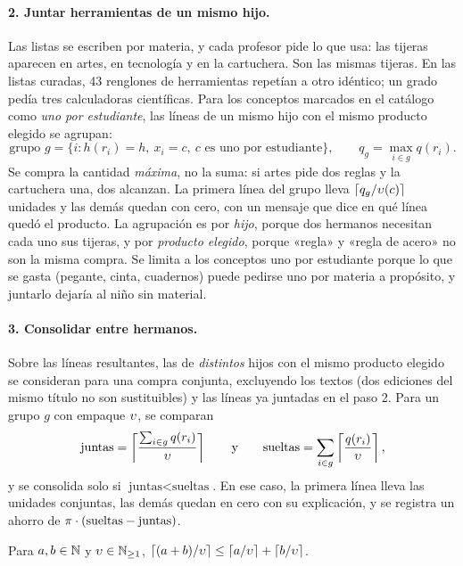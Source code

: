 \paragraph{2. Juntar herramientas de un mismo hijo.} Las listas se escriben por
materia, y cada profesor pide lo que usa: las tijeras aparecen en artes, en
tecnología y en la cartuchera. Son las mismas tijeras. En las listas curadas,
43 renglones de herramientas repetían a otro idéntico; un grado pedía tres
calculadoras científicas. Para los conceptos marcados en el catálogo como
\emph{uno por estudiante}, las líneas de un mismo hijo con el mismo producto
elegido se agrupan:
\[
  \text{grupo } g=\{i : h(r_i)=h,\ x_i=c,\ c \text{ es uno por estudiante}\},
  \qquad q_g=\max_{i\in g}q(r_i).
\]
Se compra la cantidad \emph{máxima}, no la suma: si artes pide dos reglas y la
cartuchera una, dos alcanzan. La primera línea del grupo lleva
$\left\lceil q_g/\upsilon(c) \right\rceil$ unidades y las demás quedan con cero, con un mensaje que
dice en qué línea quedó el producto. La agrupación es por \emph{hijo}, porque
dos hermanos necesitan cada uno sus tijeras, y por \emph{producto elegido},
porque «regla» y «regla de acero» no son la misma compra. Se limita a los
conceptos uno por estudiante porque lo que se gasta (pegante, cinta,
cuadernos) puede pedirse uno por materia a propósito, y juntarlo dejaría al
niño sin material.

\paragraph{3. Consolidar entre hermanos.} Sobre las líneas resultantes, las de
\emph{distintos} hijos con el mismo producto elegido se consideran para una
compra conjunta, excluyendo los textos (dos ediciones del mismo título no son
sustituibles) y las líneas ya juntadas en el paso 2. Para un grupo $g$ con
empaque $\upsilon$, se comparan
\[
  \text{juntas}=\left\lceil \frac{\sum_{i\in g}q(r_i)}{\upsilon} \right\rceil
  \qquad\text{y}\qquad
  \text{sueltas}=\sum_{i\in g}\left\lceil \frac{q(r_i)}{\upsilon} \right\rceil,
\]
y se consolida solo si $\text{juntas}<\text{sueltas}$. En ese caso, la primera
línea lleva las unidades conjuntas, las demás quedan en cero con su
explicación, y se registra un ahorro de $\pi\cdot(\text{sueltas}-\text{juntas})$.

\begin{lema}
\label{lem:techo}
Para $a,b\in\mathbb{N}$ y $\upsilon\in\mathbb{N}_{\geq1}$,
$\left\lceil (a+b)/\upsilon \right\rceil\leq\left\lceil a/\upsilon \right\rceil+\left\lceil b/\upsilon \right\rceil$.
\end{lema}

